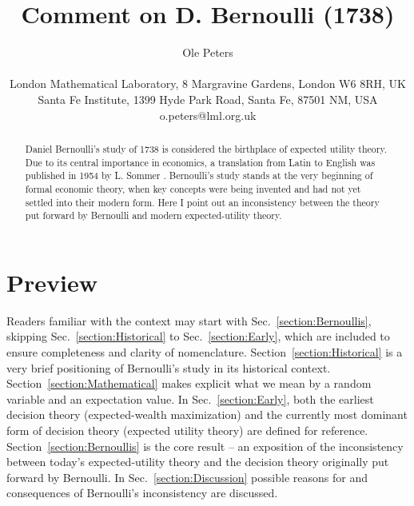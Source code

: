 \documentclass[pdftex]{article}
\newcommand{\secref}[1]{Sec.~\ref{section:#1}}
\newcommand{\Secref}[1]{Section~\ref{section:#1}}
\begin{document}

\title{Comment on D. Bernoulli (1738)}
\author{Ole Peters\\
\\
{\small London Mathematical Laboratory, 8 Margravine Gardens, London W6 8RH, UK}\\
{\small Santa Fe Institute, 1399 Hyde Park Road, Santa Fe, 87501 NM, USA}\\
{\small o.peters@lml.org.uk}}
\maketitle


\begin{abstract}
Daniel Bernoulli's study of 1738 is considered the birthplace of expected utility theory. Due to its central importance in economics, a translation from Latin to English was published in 1954 by L. Sommer \cite{Bernoulli1738}. Bernoulli's study stands at the very beginning of formal economic theory, when key concepts were being invented and had not yet settled into their modern form. Here I point out an inconsistency between the theory put forward by Bernoulli and modern expected-utility theory. 
\end{abstract}

\section{Preview}
Readers familiar with the context may start with \secref{Bernoullis}, skipping \secref{Historical} to \secref{Early}, which are included to ensure completeness and clarity of nomenclature. \Secref{Historical} is a very brief positioning of Bernoulli's study in its historical context. \Secref{Mathematical} makes explicit what we mean by a random variable and an expectation value. In \secref{Early}, both the earliest decision theory (expected-wealth maximization) and the currently most dominant form of decision theory (expected utility theory) are defined for reference. \Secref{Bernoullis} is the core result -- an exposition of the inconsistency between today's expected-utility theory and the decision theory originally put forward by Bernoulli. In \secref{Discussion} possible reasons for and consequences of Bernoulli's inconsistency are discussed.
 
\end{document}
